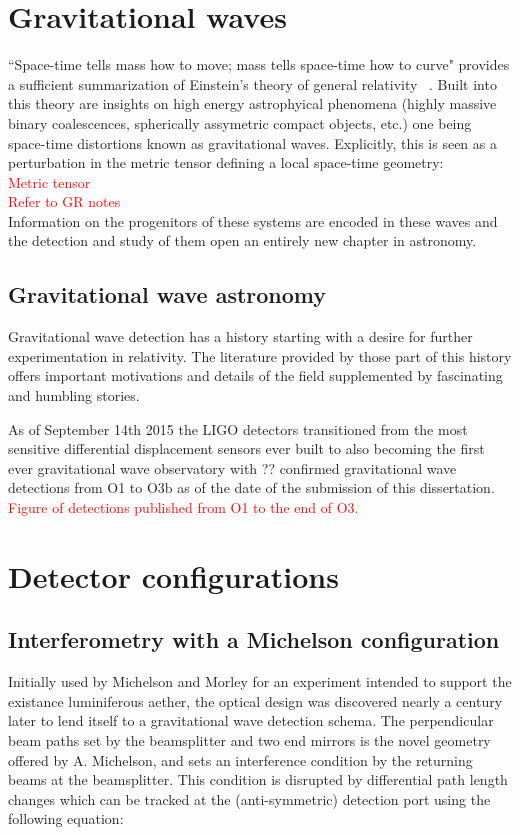 \section{Gravitational waves}
``Space-time tells mass how to move; mass tells space-time how to curve" provides a sufficient summarization of Einstein's theory of general relativity ~\cite{Misner1973}. Built into this theory are insights on high energy astrophyical phenomena (highly massive binary coalescences, spherically assymetric compact objects, etc.) one being space-time distortions known as gravitational waves. Explicitly, this is seen as a perturbation in the metric tensor defining a local space-time geometry:
\\
\textcolor{red}{Metric tensor}
\\
\textcolor{red}{Refer to GR notes}
\\
Information on the progenitors of these systems are encoded in these waves and the detection and study of them open an entirely new chapter in astronomy.
\subsection{Gravitational wave astronomy}
Gravitational wave detection has a history starting with a desire for further experimentation in relativity. The literature provided by those part of this history offers important motivations and details of the field supplemented by fascinating and humbling stories.


As of September 14th 2015 the LIGO detectors transitioned from the most sensitive differential displacement sensors ever built to also becoming the first ever gravitational wave observatory with ?? confirmed gravitational wave detections from O1 to O3b as of the date of the submission of this dissertation. 
\textcolor{red}{Figure of detections published from O1 to the end of O3.}
\newpage
\section{Detector configurations}
\subsection{Interferometry with a Michelson configuration}
Initially used by Michelson and Morley for an experiment intended to support the existance luminiferous aether, the optical design was discovered nearly a century later to lend itself to a gravitational wave detection schema. The perpendicular beam paths set by the beamsplitter and two end mirrors is the novel geometry offered by A. Michelson, and sets an interference condition by the returning beams at the beamsplitter. This condition is disrupted by differential path length changes which can be tracked at the (anti-symmetric) detection port using the following equation:

